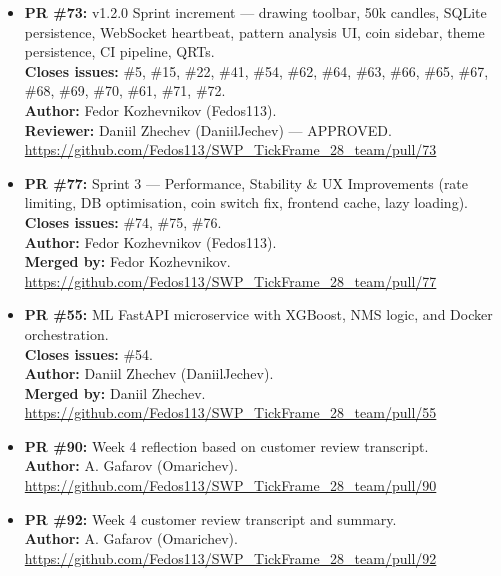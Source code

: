 \documentclass[11pt,a4paper]{article}
\begin{document}
\begin{itemize}[leftmargin=*]

    \item \textbf{PR \#73:} v1.2.0 Sprint increment --- drawing toolbar, 50k candles, SQLite persistence, WebSocket heartbeat, pattern analysis UI, coin sidebar, theme persistence, CI pipeline, QRTs. \\
          \textbf{Closes issues:} \#5, \#15, \#22, \#41, \#54, \#62, \#64, \#63, \#66, \#65, \#67, \#68, \#69, \#70, \#61, \#71, \#72. \\
          \textbf{Author:} Fedor Kozhevnikov (Fedos113). \\
          \textbf{Reviewer:} Daniil Zhechev (DaniilJechev) --- APPROVED. \\
          \url{https://github.com/Fedos113/SWP_TickFrame_28_team/pull/73}

    \item \textbf{PR \#77:} Sprint 3 --- Performance, Stability \& UX Improvements (rate limiting, DB optimisation, coin switch fix, frontend cache, lazy loading). \\
          \textbf{Closes issues:} \#74, \#75, \#76. \\
          \textbf{Author:} Fedor Kozhevnikov (Fedos113). \\
          \textbf{Merged by:} Fedor Kozhevnikov. \\
          \url{https://github.com/Fedos113/SWP_TickFrame_28_team/pull/77}

    \item \textbf{PR \#55:} ML FastAPI microservice with XGBoost, NMS logic, and Docker orchestration. \\
          \textbf{Closes issues:} \#54. \\
          \textbf{Author:} Daniil Zhechev (DaniilJechev). \\
          \textbf{Merged by:} Daniil Zhechev. \\
          \url{https://github.com/Fedos113/SWP_TickFrame_28_team/pull/55}

    \item \textbf{PR \#90:} Week 4 reflection based on customer review transcript. \\
          \textbf{Author:} A. Gafarov (Omarichev). \\
          \url{https://github.com/Fedos113/SWP_TickFrame_28_team/pull/90}

    \item \textbf{PR \#92:} Week 4 customer review transcript and summary. \\
          \textbf{Author:} A. Gafarov (Omarichev). \\
          \url{https://github.com/Fedos113/SWP_TickFrame_28_team/pull/92}


\end{itemize}
\end{document}
